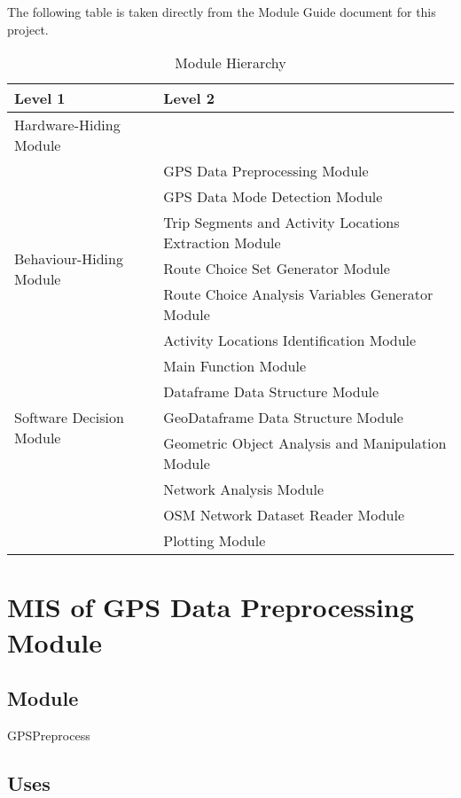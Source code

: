 \documentclass[12pt, titlepage]{article}
\begin{document}
The following table is taken directly from the Module Guide document for this project.

\begin{table}[h!]
\centering
\begin{tabular}{p{} p{}}
\toprule
\textbf{Level 1} & \textbf{Level 2}\\
\midrule

{Hardware-Hiding Module} & ~ \\
\midrule

\multirow{7}{0.3\textwidth}{Behaviour-Hiding Module}
& GPS Data Preprocessing Module\\
& GPS Data Mode Detection Module \\
& Trip Segments and Activity Locations Extraction Module\\
& Route Choice Set Generator Module\\
& Route Choice Analysis Variables Generator Module\\
& Activity Locations Identification Module\\
& Main Function Module\\ 
\midrule

\multirow{3}{0.3\textwidth}{Software Decision Module}
& Dataframe Data Structure Module\\
& GeoDataframe Data Structure Module\\
& Geometric Object Analysis and Manipulation Module\\
& Network Analysis Module\\
& OSM Network Dataset Reader Module\\
& Plotting Module\\
\bottomrule

\end{tabular}
\caption{Module Hierarchy}
\label{TblMH}
\end{table}

\newpage

\section{MIS of GPS Data Preprocessing Module} \label{GPSPreprocess}

\subsection{Module}

GPSPreprocess

\subsection{Uses}
\end{document}
